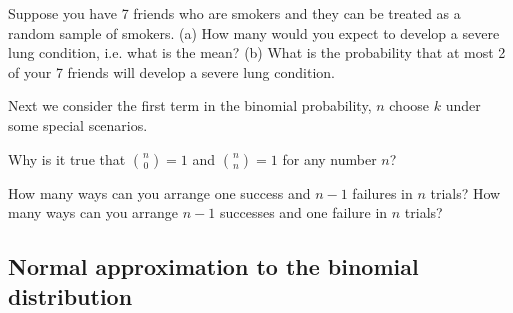 \begin{exercisewrap}
\begin{nexercise}
Suppose you have 7 friends who are smokers and they can be treated as a random sample of smokers. (a) How many would you expect to develop a severe lung condition, i.e. what is the mean? (b) What is the probability that at most 2 of your 7 friends will develop a severe lung condition.\footnotemark
\end{nexercise}
\end{exercisewrap}

Next we consider the first term in the binomial probability, $n$ choose $k$ under some special scenarios.

\begin{exercisewrap}
\begin{nexercise}
Why is it true that ${n \choose 0}=1$ and ${n \choose n}=1$ for any number $n$?\footnotemark
\end{nexercise}
\end{exercisewrap}

\begin{exercisewrap}
\begin{nexercise}
How many ways can you arrange one success and $n-1$ failures in $n$ trials? How many ways can you arrange $n-1$ successes and one failure in $n$ trials?\footnotemark
\end{nexercise}
\end{exercisewrap}



\subsection{Normal approximation to the binomial distribution}
\label{normalApproxBinomialDistSubsection}

